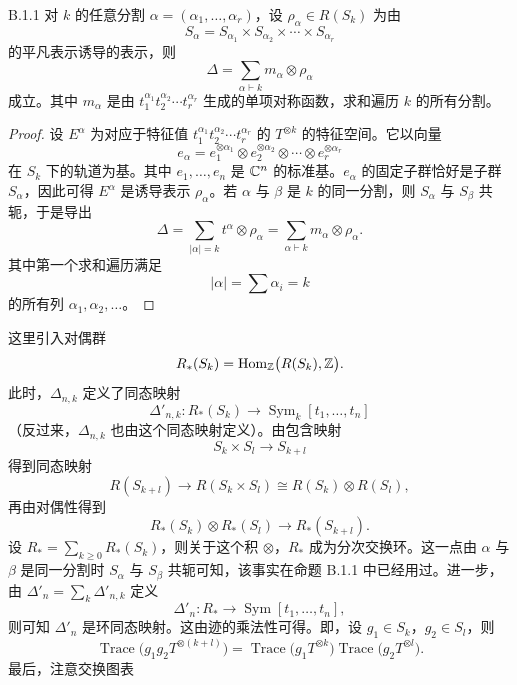 \begin{proposition*}{B.1.1}
  对 $k$ 的任意分割 $\alpha=(\alpha_1,\ldots,\alpha_r)$，设 $\rho_\alpha\in R(S_k)$ 为由
  \[
    S_\alpha = S_{\alpha_1}\times S_{\alpha_2}\times\cdots\times S_{\alpha_r}
  \]
  的平凡表示诱导的表示，则
  \[
    \Delta = \sum_{\alpha\vdash k} m_\alpha\otimes\rho_\alpha
  \]
  成立。其中 $m_\alpha$ 是由 $t_1^{\alpha_1}t_2^{\alpha_2}\cdots t_r^{\alpha_r}$ 生成的单项对称函数，求和遍历 $k$ 的所有分割。
\end{proposition*}

\begin{proof}
  设 $E^\alpha$ 为对应于特征值 $t_1^{\alpha_1}t_2^{\alpha_2}\cdots t_r^{\alpha_r}$ 的 $T^{\otimes k}$ 的特征空间。它以向量
  \[
    e_\alpha = e_1^{\otimes\alpha_1}\otimes e_2^{\otimes\alpha_2}\otimes\cdots\otimes e_r^{\otimes\alpha_r}
  \]
  在 $S_k$ 下的轨道为基。其中 $e_1,\ldots,e_n$ 是 $\mathbb{C}^n$ 的标准基。$e_\alpha$ 的固定子群恰好是子群 $S_\alpha$，因此可得 $E^\alpha$ 是诱导表示 $\rho_\alpha$。若 $\alpha$ 与 $\beta$ 是 $k$ 的同一分割，则 $S_\alpha$ 与 $S_\beta$ 共轭，于是导出
  \[
    \Delta = \sum_{|\alpha|=k} t^\alpha\otimes\rho_\alpha
           = \sum_{\alpha\vdash k} m_\alpha\otimes\rho_\alpha.
  \]
  其中第一个求和遍历满足
  \[
    |\alpha| = \sum \alpha_i = k
  \]
  的所有列 $\alpha_1,\alpha_2,\ldots$。
\end{proof}

这里引入对偶群
\[
  R_*(S_k) = \operatorname{Hom}_{\mathbb{Z}}\bigl(R(S_k),\mathbb{Z}\bigr).
\]
此时，$\Delta_{n,k}$ 定义了同态映射
\[
  \Delta'_{n,k}\colon R_*(S_k)\longrightarrow \operatorname{Sym}_k[t_1,\ldots,t_n]
\]
（反过来，$\Delta_{n,k}$ 也由这个同态映射定义）。由包含映射
\[
  S_k\times S_l\longrightarrow S_{k+l}
\]
得到同态映射
\[
  R(S_{k+l})\longrightarrow R(S_k\times S_l)
  \cong R(S_k)\otimes R(S_l),
\]
再由对偶性得到
\[
  R_*(S_k)\otimes R_*(S_l)\longrightarrow R_*(S_{k+l}).
\]
设 $R_*=\sum_{k\ge 0}R_*(S_k)$，则关于这个积 $\otimes$，$R_*$ 成为分次交换环。这一点由 $\alpha$ 与 $\beta$ 是同一分割时 $S_\alpha$ 与 $S_\beta$ 共轭可知，该事实在命题 B.1.1 中已经用过。进一步，由 $\Delta'_n=\sum_k\Delta'_{n,k}$ 定义
\[
  \Delta'_n\colon R_*\longrightarrow \operatorname{Sym}[t_1,\ldots,t_n],
\]
则可知 $\Delta'_n$ 是环同态映射。这由迹的乘法性可得。即，设 $g_1\in S_k$，$g_2\in S_l$，则
\[
  \operatorname{Trace}\bigl(g_1g_2T^{\otimes(k+l)}\bigr)
  = \operatorname{Trace}\bigl(g_1T^{\otimes k}\bigr)
    \operatorname{Trace}\bigl(g_2T^{\otimes l}\bigr).
\]
最后，注意交换图表

